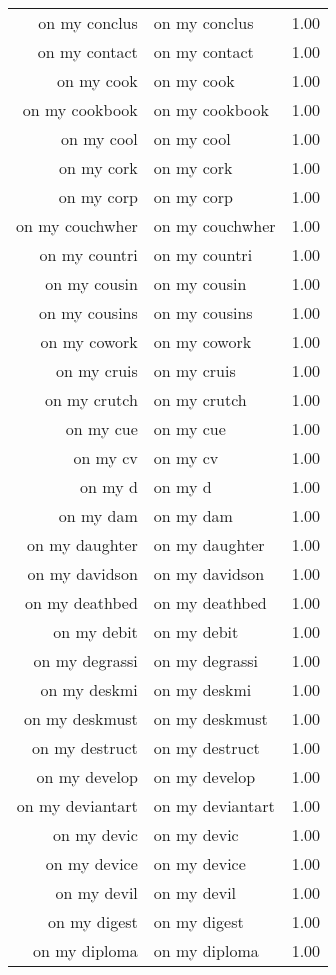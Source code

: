 \begin{table}[ht]
\begin{tabular}{rlr}
  on my conclus & on my conclus & 1.00 \\ 
  on my contact & on my contact & 1.00 \\ 
  on my cook & on my cook & 1.00 \\ 
  on my cookbook & on my cookbook & 1.00 \\ 
  on my cool & on my cool & 1.00 \\ 
  on my cork & on my cork & 1.00 \\ 
  on my corp & on my corp & 1.00 \\ 
  on my couchwher & on my couchwher & 1.00 \\ 
  on my countri & on my countri & 1.00 \\ 
  on my cousin & on my cousin & 1.00 \\ 
  on my cousins & on my cousins & 1.00 \\ 
  on my cowork & on my cowork & 1.00 \\ 
  on my cruis & on my cruis & 1.00 \\ 
  on my crutch & on my crutch & 1.00 \\ 
  on my cue & on my cue & 1.00 \\ 
  on my cv & on my cv & 1.00 \\ 
  on my d & on my d & 1.00 \\ 
  on my dam & on my dam & 1.00 \\ 
  on my daughter & on my daughter & 1.00 \\ 
  on my davidson & on my davidson & 1.00 \\ 
  on my deathbed & on my deathbed & 1.00 \\ 
  on my debit & on my debit & 1.00 \\ 
  on my degrassi & on my degrassi & 1.00 \\ 
  on my deskmi & on my deskmi & 1.00 \\ 
  on my deskmust & on my deskmust & 1.00 \\ 
  on my destruct & on my destruct & 1.00 \\ 
  on my develop & on my develop & 1.00 \\ 
  on my deviantart & on my deviantart & 1.00 \\ 
  on my devic & on my devic & 1.00 \\ 
  on my device & on my device & 1.00 \\ 
  on my devil & on my devil & 1.00 \\ 
  on my digest & on my digest & 1.00 \\ 
  on my diploma & on my diploma & 1.00 \\ 

\end{tabular}
\end{table}
